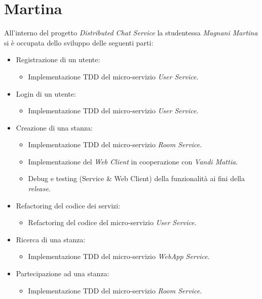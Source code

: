 \section{Martina}

All'interno del progetto \textit{Distributed Chat Service} la studentessa \textit{Magnani Martina} si è occupata dello sviluppo delle seguenti parti:

\begin{itemize}
    \item Registrazione di un utente:
    \begin{itemize}
        \item Implementazione TDD del micro-servizio \textit{User Service}.
    \end{itemize}
    \item Login di un utente:
    \begin{itemize}
        \item Implementazione TDD del micro-servizio \textit{User Service}.
    \end{itemize}
    \item Creazione di una stanza:
    \begin{itemize}
        \item Implementazione TDD del micro-servizio \textit{Room Service}.
        \item Implementazione del \textit{Web Client} in cooperazione con \textit{Vandi Mattia}.
        \item Debug e testing (Service \& Web Client) della funzionalità ai fini della \textit{release}.
    \end{itemize}
    \item Refactoring del codice dei servizi:
    \begin{itemize}
        \item Refactoring del codice del micro-servizio \textit{User Service}.
    \end{itemize}
    \item Ricerca di una stanza:
    \begin{itemize}
        \item Implementazione TDD del micro-servizio \textit{WebApp Service}.
    \end{itemize}
    \item Partecipazione ad una stanza:
    \begin{itemize}
        \item Implementazione TDD del micro-servizio \textit{Room Service}.
    \end{itemize}

\end{itemize}

